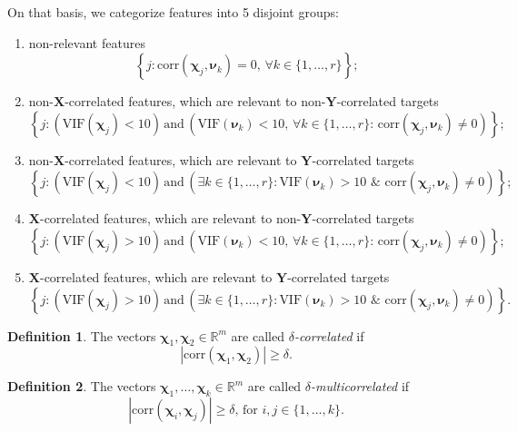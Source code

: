 \documentclass[12pt,twoside]{article}
\theoremstyle{definition}
\newtheorem{definition}{Definition}
\newcommand{\bY}{\mathbf{Y}}
\newcommand{\bX}{\mathbf{X}}
\newcommand{\bbR}{\mathbb{R}}
\newcommand{\bchi}{\boldsymbol{\chi}}
\newcommand{\bnu}{\boldsymbol{\nu}}
\begin{document}
On that basis, we categorize features into 5 disjoint groups:
\begin{enumerate}
	\item non-relevant features
	\[
		\left\{j: \text{corr}(\bchi_j, \bnu_k) = 0, \, \forall k \in \{1, \dots, r\}\right\};
	\]
	\item non-$\bX$-correlated features, which are relevant to non-$\bY$-correlated targets
	\[
		\left\{j: \left(\text{VIF}(\bchi_j) < 10\right) \, \text{and} \, \left(\text{VIF}(\bnu_k) < 10 , \, \forall k \in \{1, \dots, r\}: \,  \text{corr}(\bchi_j, \bnu_k) \neq 0 \right)\right\};
	\]
	\item non-$\bX$-correlated features, which are relevant to $\bY$-correlated targets
	\[
		\left\{j: \left(\text{VIF}(\bchi_j) < 10\right) \, \text{and} \, \left( \exists k \in \{1, \dots, r\}: \text{VIF}(\bnu_k) > 10 \,\, \& \,\, \text{corr}(\bchi_j, \bnu_k) \neq 0 \right)\right\};
	\]
	\item $\bX$-correlated features, which are relevant to non-$\bY$-correlated targets
	\[
		\left\{j: \left(\text{VIF}(\bchi_j) > 10\right) \, \text{and} \, \left(\text{VIF}(\bnu_k) < 10 , \, \forall k \in \{1, \dots, r\}: \,  \text{corr}(\bchi_j, \bnu_k) \neq 0 \right)\right\};
	\]
	\item $\bX$-correlated features, which are relevant to $\bY$-correlated targets
	\[
		\left\{j: \left(\text{VIF}(\bchi_j) > 10\right) \, \text{and} \, \left( \exists k \in \{1, \dots, r\}: \text{VIF}(\bnu_k) > 10 \,\, \& \,\, \text{corr}(\bchi_j, \bnu_k) \neq 0 \right)\right\}.
	\]
\end{enumerate}

\hrulefill

\begin{definition}
	The vectors $\bchi_1, \bchi_2 \in \bbR^m$ are called \textit{$\delta$-correlated} if 
	\[
	|\text{corr} (\bchi_1, \bchi_2)| \geq \delta.
	\]
\end{definition}
\begin{definition}
	The vectors $\bchi_1, \dots, \bchi_k \in \bbR^m$ are called \textit{$\delta$-multicorrelated} if 
	\[
		|\text{corr} (\bchi_i, \bchi_j)| \geq \delta, \, \text{for } i, j \in \{1, \dots, k\}.
	\]
\end{definition}
\end{document}
